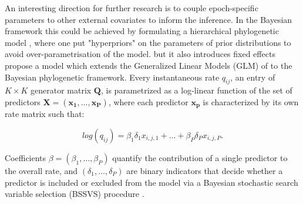 An interesting direction for further research is to couple epoch-specific parameters to other external covariates to inform the inference.
In the Bayesian framework this could be achieved by formulating a hierarchical phylogenetic model \citep{Edo-Matas2011}, where one put "hyperpriors" on the parameters of prior distributions to avoid over-parametrisation of the model.
but it also introduces fixed effects
\citet{Lemey2014} propose a model which extends the Generalized Linear Models (GLM) of \citet{Nelder1972} to the Bayesian phylogenetic framework.
Every instantaneous rate $q_{ij}$, an entry of $K \times K$ generator matrix $\mathbf{Q}$, is parametrized as a log-linear function of the set of predictors $\mathbf{X}=\left( \mathbf{x_{1}},\ldots,\mathbf{x_{P}}\right)$, where each predictor $\mathbf{x_{p}}$ is characterized by its own rate matrix such that:

\begin{equation}
log(q_{ij})=\beta_{1}\delta_{1}x_{i,j,1}+\ldots+\beta_{P}\delta_{P}x_{i,j,P}.
\label{eq:glm}
\end{equation}

Coefficients $\beta=\left(\beta_{1},\ldots,\beta_{P}\right)$ quantify the contribution of a single predictor to the overall rate, and $\left(\delta_{1},\ldots,\delta_{P}\right)$ are binary indicators that decide whether a predictor is included or excluded from the model via a Bayesian stochastic search variable selection (BSSVS) procedure \citep{Kuo1998,Lemey2009}.

